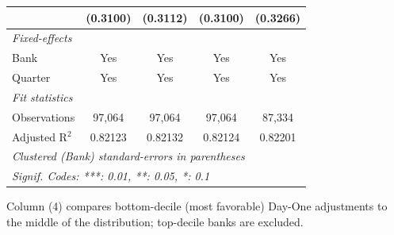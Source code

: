 \begin{tabular}{lcccc}
                                   & (0.3100)        & (0.3112)        & (0.3100)        & (0.3266)\\   
   \midrule
   \emph{Fixed-effects}\\
   Bank                            & Yes             & Yes             & Yes             & Yes\\  
   Quarter                         & Yes             & Yes             & Yes             & Yes\\  
   \midrule
   \emph{Fit statistics}\\
   Observations                    & 97,064          & 97,064          & 97,064          & 87,334\\  
   Adjusted R$^2$                  & 0.82123         & 0.82132         & 0.82124         & 0.82201\\  
   \midrule \midrule
   \multicolumn{5}{l}{\emph{Clustered (Bank) standard-errors in parentheses}}\\
   \multicolumn{5}{l}{\emph{Signif. Codes: ***: 0.01, **: 0.05, *: 0.1}}\\
\end{tabular}
 
\par \raggedright 
Column (4) compares bottom-decile (most favorable) Day-One adjustments to the middle of the distribution; top-decile banks are excluded.
\par\endgroup


